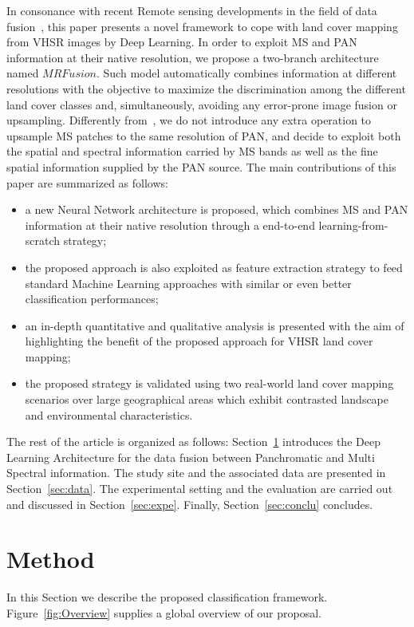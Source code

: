 \documentclass[journal]{IEEEtran}
\newcommand{\method}{$MRFusion$}
\begin{document}
In consonance with recent Remote sensing developments in the field of data fusion~\cite{LiuJZZZLYT18,XuLRDGZ18}, this paper presents a novel framework to cope with land cover mapping from VHSR images by Deep Learning. In order to exploit MS and PAN information at their native resolution, we propose a two-branch architecture named \method{}. Such model automatically combines information at different resolutions with the objective to maximize the discrimination among the different land cover classes and, simultaneously, avoiding any error-prone image fusion or upsampling.
Differently from~\cite{LiuJZZZLYT18}, we do not introduce any extra operation to upsample MS patches to the same resolution of PAN, and decide to exploit both the spatial and spectral information carried by MS bands as well as the fine spatial information supplied by the PAN source. 
The main contributions of this paper are summarized as follows:
\begin{itemize}
\item a new Neural Network architecture is proposed, which combines MS and PAN information at their native resolution through a end-to-end learning-from-scratch strategy;
\item the proposed approach is also exploited as feature extraction strategy to feed standard Machine Learning approaches with similar or even better classification performances;
\item an in-depth quantitative and qualitative analysis is presented with the aim of highlighting the benefit of the proposed approach for VHSR land cover mapping;
\item the proposed strategy is validated using two real-world land cover mapping scenarios over large geographical areas which exhibit contrasted landscape and environmental characteristics.
\end{itemize}

The rest of the article is organized as follows: Section~\ref{sec:method} introduces the Deep Learning Architecture for the data fusion between Panchromatic and Multi Spectral information. The study site and the associated data are presented in Section~\ref{sec:data}. The experimental setting and the evaluation are carried out and discussed in Section~\ref{sec:expe}. Finally, Section~\ref{sec:conclu} concludes.


\section{Method}
\label{sec:method}
In this Section we describe the proposed classification framework. Figure~\ref{fig:Overview} supplies a global overview of our proposal. 
\end{document}
